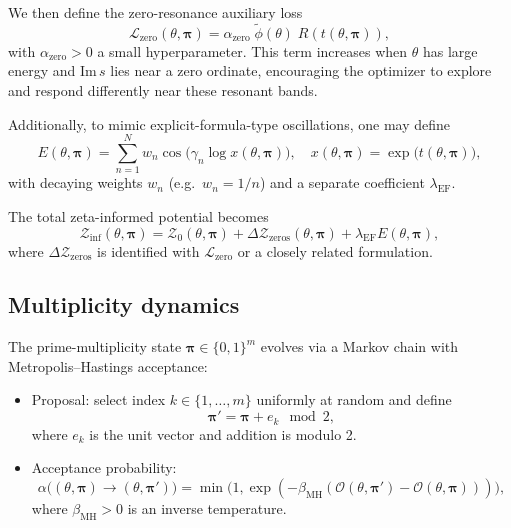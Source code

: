 \documentclass[11pt]{article}
\begin{document}
We then define the zero-resonance auxiliary loss
\begin{equation}
  \mathcal{L}_{\mathrm{zero}}(\theta,\bm{\pi}) = \alpha_{\mathrm{zero}}\;\tilde{\phi}(\theta)\; R(t(\theta,\bm{\pi})),
  \label{eq:aux_zero_loss}
\end{equation}
with $\alpha_{\mathrm{zero}}>0$ a small hyperparameter. This term increases when $\theta$ has large energy and $\mathrm{Im}\,s$ lies near a zero ordinate, encouraging the optimizer to explore and respond differently near these resonant bands.

Additionally, to mimic explicit-formula-type oscillations, one may define
\begin{equation}
  E(\theta,\bm{\pi}) = \sum_{n=1}^N w_n \cos\big(\gamma_n \log x(\theta,\bm{\pi})\big),
  \quad x(\theta,\bm{\pi}) = \exp\big(t(\theta,\bm{\pi})\big),
  \label{eq:explicit_style}
\end{equation}
with decaying weights $w_n$ (e.g.\ $w_n = 1/n$) and a separate coefficient $\lambda_{\mathrm{EF}}$.

The total zeta-informed potential becomes
\begin{equation}
  \mathcal{Z}_{\mathrm{inf}}(\theta,\bm{\pi})
    = \mathcal{Z}_0(\theta,\bm{\pi})
      + \Delta \mathcal{Z}_{\mathrm{zeros}}(\theta,\bm{\pi})
      + \lambda_{\mathrm{EF}} E(\theta,\bm{\pi}),
  \label{eq:zeta_informed_total}
\end{equation}
where $\Delta \mathcal{Z}_{\mathrm{zeros}}$ is identified with $\mathcal{L}_{\mathrm{zero}}$ or a closely related formulation.

\subsection{Multiplicity dynamics}

The prime-multiplicity state $\bm{\pi}\in\{0,1\}^m$ evolves via a Markov chain with Metropolis--Hastings acceptance:

\begin{itemize}[leftmargin=*]
  \item Proposal: select index $k\in\{1,\dots,m\}$ uniformly at random and define
  \[
    \bm{\pi}' = \bm{\pi} + e_k \mod 2,
  \]
  where $e_k$ is the unit vector and addition is modulo 2.
  \item Acceptance probability:
  \[
    \alpha\big((\theta,\bm{\pi}) \to (\theta,\bm{\pi}')\big)
      = \min\big(1, \exp(-\beta_{\mathrm{MH}}(\mathcal{O}(\theta,\bm{\pi}') - \mathcal{O}(\theta,\bm{\pi})))\big),
  \]
  where $\beta_{\mathrm{MH}}>0$ is an inverse temperature.
\end{itemize}
\end{document}
